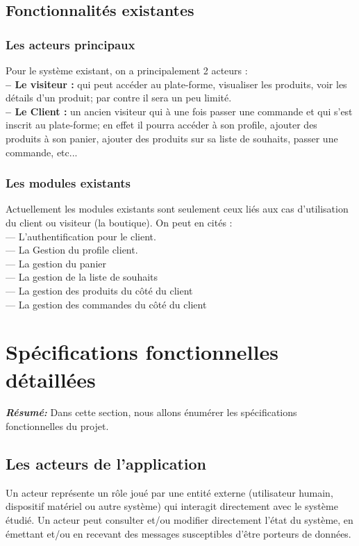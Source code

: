 \documentclass[a4paper, 12pt]{report}
\begin{document}
\section{Fonctionnalités existantes}

\subsection{Les acteurs principaux}
Pour le système existant, on a principalement 2 acteurs :\\
\textbf{-- Le visiteur :} qui peut accéder au plate-forme, visualiser les produits, voir les détails d'un produit; par contre il sera un peu limité.\\
\textbf{-- Le Client :} un ancien visiteur qui à une fois passer une commande et qui s'est inscrit au plate-forme; en effet il pourra accéder à son profile, ajouter des produits à son panier, ajouter des produits sur sa liste de souhaits, passer une commande, etc...

\subsection{Les modules existants}
Actuellement les modules existants sont seulement ceux liés aux cas d'utilisation du client ou visiteur (la boutique). On peut en cités :\\
--- L'authentification pour le client. \\
--- La Gestion du profile client.\\ 
--- La gestion du panier \\
--- La gestion de la liste de souhaits\\
--- La gestion des produits du côté du client \\
--- La gestion des commandes du côté du client \\
 

\chapter{Spécifications fonctionnelles détaillées}
\textit{\textbf{Résumé:}}
Dans cette section, nous allons énumérer les spécifications fonctionnelles du projet. 
\setcounter{minitocdepth}{2}
\minitoc
\section{Les acteurs de l'application}
Un acteur représente un rôle joué par une entité externe (utilisateur humain, dispositif
matériel ou autre système) qui interagit directement avec le système étudié. Un acteur peut
consulter et/ou modifier directement l’état du système, en émettant et/ou en recevant des
messages susceptibles d’être porteurs de données.
\end{document}
